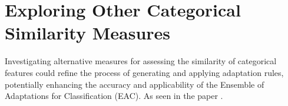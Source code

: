\documentclass[a4paper, 12pt]{report}
\begin{document}
\section{Exploring Other Categorical Similarity Measures}
Investigating alternative measures for assessing the similarity of categorical features could refine the process of generating and applying adaptation rules, 
potentially enhancing the accuracy and applicability of the Ensemble of Adaptations for Classification (EAC). As seen in the paper \cite{jalali2017learning}.



\end{document}
